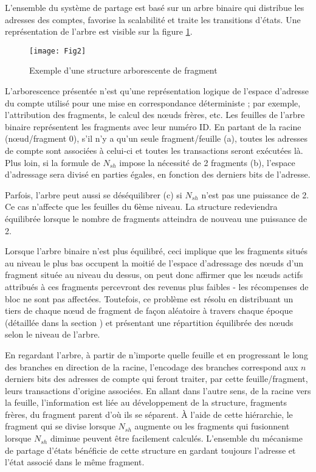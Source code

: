 \documentclass[journal]{IEEEtran}
\begin{document}
L'ensemble du système de partage est basé sur un arbre binaire qui distribue les adresses des comptes, favorise la scalabilité et traite les transitions d'états. Une représentation de l'arbre est visible sur la figure \ref{Fig.2}.

\begin{figure}
	\texttt{[image: Fig2]} %
	\caption{Exemple d'une structure arborescente de fragment} %
	\label{Fig.2} %
\end{figure}

L'arborescence présentée n'est qu'une représentation logique de l'espace d'adresse du compte utilisé pour une mise en correspondance déterministe ; par exemple, l'attribution des fragments, le calcul des nœuds frères, etc. Les feuilles de l'arbre binaire représentent les fragments avec leur numéro ID. En partant de la racine (nœud/fragment 0), s'il n'y a qu'un seule fragment/feuille (a), toutes les adresses de compte sont associées à celui-ci et toutes les transactions seront exécutées là. Plus loin, si la formule de ${N}_{sh}$ impose la nécessité de 2 fragments (b), l'espace d'adressage sera divisé en parties égales, en fonction des derniers bits de l'adresse.

Parfois, l'arbre peut aussi se déséquilibrer (c) si ${N}_{sh}$ n'est pas une puissance de 2. Ce cas n'affecte que les feuilles du 6ème niveau. La structure redeviendra équilibrée lorsque le nombre de fragments atteindra de nouveau une puissance de 2.

Lorsque l'arbre binaire n’est plus équilibré, ceci implique que les fragments situés au niveau le plus bas occupent la moitié de l'espace d'adressage des nœuds d'un fragment située au niveau du dessus, on peut donc affirmer que les nœuds actifs attribués à ces fragments percevront des revenus plus faibles - les récompenses de bloc ne sont pas affectées. Toutefois, ce problème est résolu en distribuant un tiers de chaque nœud de fragment de façon aléatoire à travers chaque époque (détaillée dans la section ) et présentant une répartition équilibrée des nœuds selon le niveau de l'arbre.

En regardant l'arbre, à partir de n'importe quelle feuille et en progressant le long des branches en direction de la racine, l'encodage des branches correspond aux $n$ derniers bits des adresses de compte qui feront traiter, par cette feuille/fragment, leurs transactions d'origine associées. En allant dans l'autre sens, de la racine vers la feuille, l'information est liée au développement de la structure, fragments frères, du fragment parent d'où ils se séparent. À l'aide de cette hiérarchie, le fragment qui se divise lorsque ${N}_{sh}$ augmente ou les fragments qui fusionnent lorsque ${N}_{sh}$ diminue peuvent être facilement calculés. L'ensemble du mécanisme de partage d'états bénéficie de cette structure en gardant toujours l'adresse et l'état associé dans le même fragment.
\end{document}
